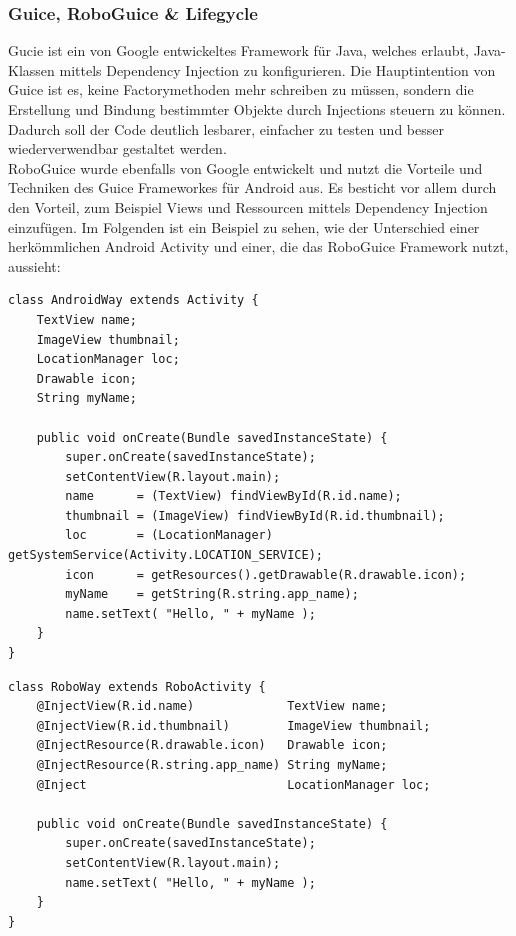 \documentclass[a4paper,12pt]{article}
\begin{document}
\subsubsection{Guice, RoboGuice \& Lifegycle}
Gucie ist ein von Google entwickeltes Framework für Java, welches erlaubt, Java-Klassen mittels Dependency Injection zu konfigurieren. Die Hauptintention von Guice ist es, keine Factorymethoden mehr schreiben zu müssen, sondern die Erstellung und Bindung bestimmter Objekte durch Injections steuern zu können. Dadurch soll der Code deutlich lesbarer, einfacher zu testen und besser wiederverwendbar gestaltet werden. \\
RoboGuice wurde ebenfalls von Google entwickelt und nutzt die Vorteile und Techniken des Guice Frameworkes für Android aus. Es besticht vor allem durch den Vorteil, zum Beispiel Views und Ressourcen mittels Dependency Injection einzufügen.  Im Folgenden ist ein Beispiel zu sehen, wie der Unterschied einer herkömmlichen Android Activity und einer, die das RoboGuice Framework nutzt, aussieht:\\
\lstset{language=Java}
\begin{lstlisting}[caption={Standard Android Activity \cite{roboguice-libaries} }]
    class AndroidWay extends Activity { 
    TextView name; 
    ImageView thumbnail; 
    LocationManager loc; 
    Drawable icon; 
    String myName; 

    public void onCreate(Bundle savedInstanceState) { 
        super.onCreate(savedInstanceState); 
        setContentView(R.layout.main);
        name      = (TextView) findViewById(R.id.name); 
        thumbnail = (ImageView) findViewById(R.id.thumbnail); 
        loc       = (LocationManager) getSystemService(Activity.LOCATION_SERVICE); 
        icon      = getResources().getDrawable(R.drawable.icon); 
        myName    = getString(R.string.app_name); 
        name.setText( "Hello, " + myName ); 
    } 
} 
\end{lstlisting}
\lstset{language=Java}
\begin{lstlisting}[caption={Android Activity mit RoboGuice \cite{roboguice-libaries}}]
   class RoboWay extends RoboActivity { 
    @InjectView(R.id.name)             TextView name; 
    @InjectView(R.id.thumbnail)        ImageView thumbnail; 
    @InjectResource(R.drawable.icon)   Drawable icon; 
    @InjectResource(R.string.app_name) String myName; 
    @Inject                            LocationManager loc; 

    public void onCreate(Bundle savedInstanceState) { 
        super.onCreate(savedInstanceState); 
        setContentView(R.layout.main);
        name.setText( "Hello, " + myName ); 
    } 
} 
\end{lstlisting}
\end{document}

